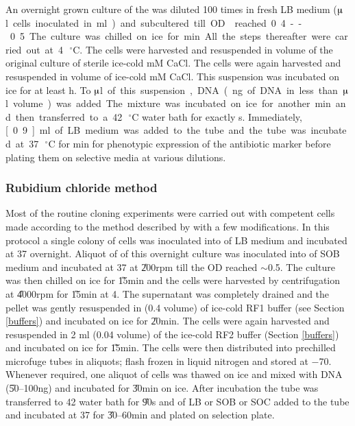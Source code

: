 An overnight grown culture of the  was diluted 100 times
in fresh LB medium (\unit[100]{$\muup$l} cells inoculated in
\unit[10]{ml}) and subcultered till OD reached 0.4--0.5.
The culture was chilled on ice for \unit[15]{min}. All the steps
thereafter were carried out at 4\,$^\circ$C. The cells were
harvested and resuspended in  volume of the
original culture of sterile ice-cold \unit[100]{mM} CaCl.
The cells were again harvested and resuspended in 
volume of ice-cold \unit[100]{mM} CaCl\@. This suspension
was incubated on ice for at least \unit[1]{h}\@. To
\unit[100]{$\muup$l} of this suspension, DNA (\unit[10--100]{ng}
of DNA in less than \unit[10]{$\muup$l} volume) was added. The
mixture was incubated on ice for another \unit[30]{min} and then
transferred to a 42\,$^\circ$C water bath for exactly
\unit[90]{s}. Immediately, \unit[0.9]{ml} of LB medium was added
to the tube and the tube was incubated at 37\,$^\circ$C for
\unit[30--45]{min} for phenotypic expression of the antibiotic
marker before plating them on selective media at various
dilutions.

\subsubsection{Rubidium chloride method} \label{rubidium}

Most of the routine cloning experiments were carried out with
competent cells made according to the method described by
\citet{Hanahan1985} with a few modifications. In this protocol a
single colony of  cells was inoculated into  of LB
medium and incubated at 37\dg{} overnight. Aliquot of  of
this overnight culture was inoculated into  of SOB medium
and incubated at 37\dg{} at \U{200}{rpm} till the OD
reached $\sim$0.5. The culture was then chilled on ice for
\U{15}{min} and the cells were harvested by centrifugation at
\U{4000}{rpm} for \U{15}{min} at 4\dg{}. The supernatant was
completely drained and the pellet was gently resuspended in
 (0.4 volume) of ice-cold RF1 buffer (see Section
\ref{buffers}) and incubated on ice for \U{20}{min}. The cells
were again harvested and resuspended in 2 ml (0.04 volume) of the
ice-cold RF2 buffer (Section \ref{buffers}) and incubated on ice
for \U{15}{min}. The cells were then distributed into prechilled
microfuge tubes in  aliquots; flash frozen in liquid
nitrogen and stored at \mbox{$-$70\dg}\@. Whenever required, one
aliquot of cells was thawed on ice and mixed with DNA
(\U{50--100}{ng}) and incubated for \U{30}{min} on ice. After
incubation the tube was transferred to 42\dg{} water bath for
\U{90}{s} and  of LB or SOB or SOC added to the tube and
incubated at 37\dg{} for \U{30--60}{min} and plated on selection
plate.

